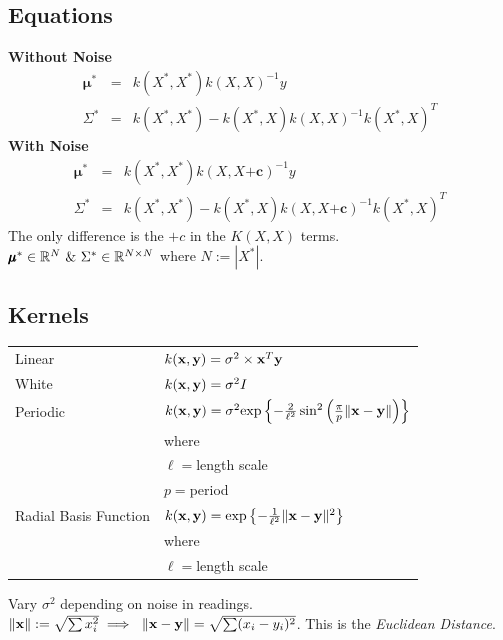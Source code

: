 \documentclass[11pt,a4paper]{article}
\begin{document}
\subsection{Equations}
\textbf{Without Noise}
\[\begin{array}{rcl}
\pmb\mu^*&=&k(X^*,X^*)k(X,X)^{-1}y\\
\Sigma^*&=&k(X^*,X^*)-k(X^*,X)k(X,X)^{-1}k(X^*,X)^T
\end{array}\]
\textbf{With Noise}
\[\begin{array}{rcl}
\pmb\mu^*&=&k(X^*,X^*)k(X,X\pmb{+c})^{-1}y\\
\Sigma^*&=&k(X^*,X^*)-k(X^*,X)k(X,X\pmb{+c})^{-1}k(X^*,X)^T
\end{array}\]
The only difference is the $+c$ in the $K(X,X)$ terms.\\
\nb $\pmb\mu^*\in\reals^N\ \&\ \Sigma^*\in\reals^{N\times N}$ where $N:=|X^*|$.

\subsection{Kernels}
\begin{center}
\begin{tabular}{l|l}
Linear&$k(\textbf{x},\textbf{y})=\sigma^2\times \textbf{x}^T\textbf{y}$\\
White&$k(\textbf{x},\textbf{y})=\sigma^2I$\\
Periodic&$k(\textbf{x},\textbf{y})=\sigma^2\text{exp}\left\{-\frac2{\ell^2}\sin^2\left(\frac{\pi}{p}\|\textbf{x}-\textbf{y}\|\right)\right\}$\\
&\quad where\\
&\quad\quad $\ell=$length scale\\
&\quad\quad $p=$period\\
Radial Basis Function&$k(\textbf{x},\textbf{y})=\text{exp}\left\{-\frac{1}{\ell^2}\|\textbf{x}-\textbf{y}\|^2\right\}$\\
&\quad where\\
&\quad\quad $\ell=$length scale\\
\end{tabular}
\end{center}
Vary $\sigma^2$ depending on noise in readings.\\
\nb $\|\x\|:=\sqrt{\sum x_i^2}\implies\ \|\x-\textbf{y}\|=\sqrt{\sum(x_i-y_i)^2}$. This is the \textit{Euclidean Distance}.
\end{document}

